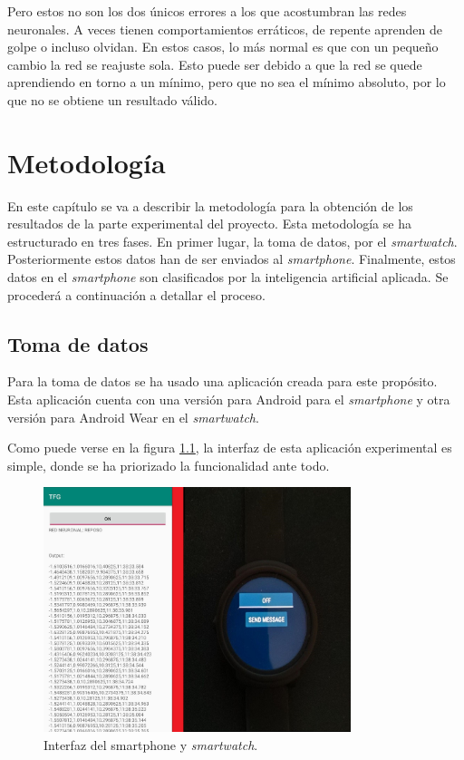 \documentclass[12pt]{book}
\numberwithin{equation}{section}
\begin{document}
Pero estos no son los dos únicos errores a los que acostumbran las redes neuronales. A veces tienen comportamientos erráticos, de repente aprenden de golpe o incluso olvidan. En estos casos, lo más normal es que con un pequeño cambio la red se reajuste sola. Esto puede ser debido a que la red se quede aprendiendo en torno a un mínimo, pero que no sea el mínimo absoluto, por lo que no se obtiene un resultado válido.


\chapter{Metodología}
En este capítulo se va a describir la metodología para la obtención de los resultados de la parte experimental del proyecto. Esta metodología se ha estructurado en tres fases. En primer lugar, la toma de datos, por el \textit{smartwatch}. Posteriormente estos datos han de ser enviados al \textit{smartphone}. Finalmente, estos datos en el \textit{smartphone} son clasificados por la inteligencia artificial aplicada. Se procederá a continuación a detallar el proceso.

\section{Toma de datos}

Para la toma de datos se ha usado una aplicación creada para este propósito. Esta aplicación cuenta con una versión para Android para el \textit{smartphone} y otra versión para Android Wear en el \textit{smartwatch}.

Como puede verse en la figura \ref{fig:mesh2}, la interfaz de esta aplicación experimental es simple, donde se ha priorizado la funcionalidad ante todo.

\begin{figure}[h]
    \centering
    \includegraphics[width=0.8\textwidth]{Interfaces.jpg}
    \caption{Interfaz del smartphone y \textit{smartwatch}.}
    \label{fig:mesh2}
\end{figure}
\end{document}

